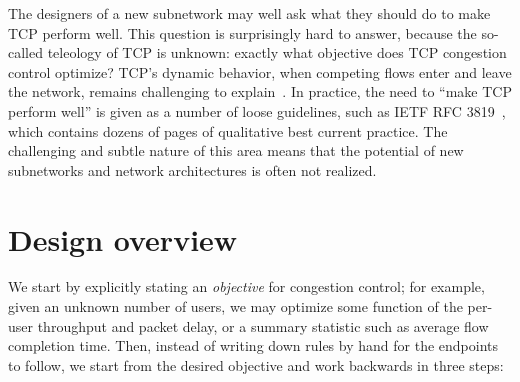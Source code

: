 The designers of a new subnetwork may well ask what they should do to
make TCP perform well. This question is surprisingly hard to answer,
because the so-called teleology of TCP is unknown: exactly what
objective does TCP congestion control optimize? TCP's dynamic
behavior, when competing flows enter and leave the network, remains
challenging to explain~\cite{slowcc}.  In practice, the need to ``make
TCP perform well'' is given as a number of loose guidelines, such as
IETF RFC 3819~\cite{rfc3819}, which contains dozens of pages of
qualitative best current practice. The challenging and subtle nature
of this area means that the potential of new subnetworks and network
architectures is often not realized.

\section{Design overview}



We start by explicitly stating an {\em objective} for congestion
control; for example, given an unknown number of users, we may
optimize some function of the per-user throughput and packet delay, or
a summary statistic such as average flow completion time. Then,
instead of writing down rules by hand for the endpoints to follow, we
start from the desired objective and work backwards in three steps:



